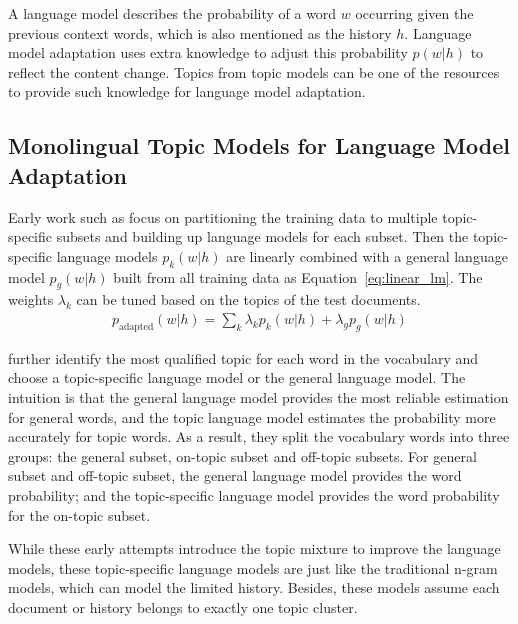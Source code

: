 A language model describes the probability of a word $w$ occurring given the previous context words, which is also mentioned as the history $h$. Language model adaptation uses extra knowledge to adjust this probability $p(w|h)$ to reflect the content change. Topics from topic models can be one of the resources to provide such knowledge for language model adaptation.

\subsection{Monolingual Topic Models for Language Model Adaptation}

Early work such as \citet{Clarkson-1997,Seymore-1997,Kneser-1997,Iyer-1999} focus on partitioning the training data to multiple topic-specific subsets and building up language models for each subset. Then the topic-specific language models $p_k(w|h)$ are linearly combined with a general language model $p_g(w|h)$ built from all training data as Equation~\ref{eq:linear_lm}. The weights $\lambda_k$ can be tuned based on the topics of the test documents.
\begin{align}
\label{eq:linear_lm}
p_\textrm{adapted}(w|h) = \sum_k \lambda_k p_k(w|h) + \lambda_g p_g(w|h)
\end{align}

\citet{Seymore-1998} further identify the most qualified topic for each word in the vocabulary and choose a topic-specific language model or the general language model. The intuition is that the general language model provides the most reliable estimation for general words, and the topic language model estimates the probability more accurately for topic words. As a result, they split the vocabulary words into three groups: the general subset, on-topic subset and off-topic subsets. For general subset and off-topic subset, the general language model provides the word probability; and the topic-specific language model provides the word probability for the on-topic subset.

While these early attempts introduce the topic mixture to improve the language models, these topic-specific language models are just like the traditional n-gram models, which can model the limited history. Besides, these models assume each document or history belongs to exactly one topic cluster.

